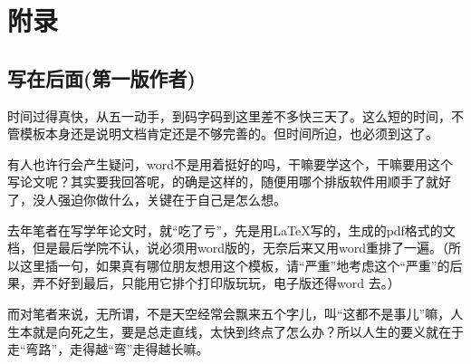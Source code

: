 \appendix

\section*{附录}
{}

\subsection*{写在后面(第一版作者)}

时间过得真快，从五一动手，到码字码到这里差不多快三天了。这么短的时间，不管模板本身还是说明文档肯定还是不够完善的。但时间所迫，也必须到这了。

有人也许行会产生疑问，word不是用着挺好的吗，干嘛要学这个，干嘛要用这个写论文呢？其实要我回答呢，的确是这样的，随便用哪个排版软件用顺手了就好了，没人强迫你做什么，关键在于自己是怎么想。

去年笔者在写学年论文时，就“吃了亏”，先是用\LaTeX 写的，生成的pdf格式的文档，但是最后学院不认，说必须用word版的，无奈后来又用word重排了一遍。（所以这里插一句，如果真有哪位朋友想用这个模板，请“严重”地考虑这个“严重”的后果，弄不好到最后，只能用它排个打印版玩玩，电子版还得word 去。）

而对笔者来说，无所谓，不是天空经常会飘来五个字儿，叫“这都不是事儿”嘛，人生本就是向死之生，要是总走直线，太快到终点了怎么办？所以人生的要义就在于走“弯路”，走得越“弯”走得越长嘛。




